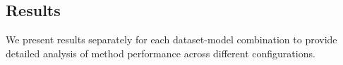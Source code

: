 \documentclass[sigconf, nonacm]{acmart}
\begin{document}
\subsection{Results}

We present results separately for each dataset-model combination to provide detailed analysis of method performance across different configurations.

\end{document}
